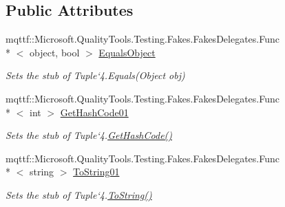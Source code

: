 \subsection*{Public Attributes}
\begin{DoxyCompactItemize}
\item 
mqttf\-::\-Microsoft.\-Quality\-Tools.\-Testing.\-Fakes.\-Fakes\-Delegates.\-Func\\*
$<$ object, bool $>$ \hyperlink{class_system_1_1_fakes_1_1_stub_tuple_3_01_t1_00_01_t2_00_01_t3_00_01_t4_01_4_ab607235e86fc97cb666af54eafa5be89}{Equals\-Object}
\begin{DoxyCompactList}\small\item\em Sets the stub of Tuple`4.Equals(\-Object obj)\end{DoxyCompactList}\item 
mqttf\-::\-Microsoft.\-Quality\-Tools.\-Testing.\-Fakes.\-Fakes\-Delegates.\-Func\\*
$<$ int $>$ \hyperlink{class_system_1_1_fakes_1_1_stub_tuple_3_01_t1_00_01_t2_00_01_t3_00_01_t4_01_4_a571aba542f69ae42dd1889a08bde7edd}{Get\-Hash\-Code01}
\begin{DoxyCompactList}\small\item\em Sets the stub of Tuple`4.\hyperlink{class_system_1_1_fakes_1_1_stub_tuple_3_01_t1_00_01_t2_00_01_t3_00_01_t4_01_4_ad744f3a9a2103626bc7c4d22136655a4}{Get\-Hash\-Code()}\end{DoxyCompactList}\item 
mqttf\-::\-Microsoft.\-Quality\-Tools.\-Testing.\-Fakes.\-Fakes\-Delegates.\-Func\\*
$<$ string $>$ \hyperlink{class_system_1_1_fakes_1_1_stub_tuple_3_01_t1_00_01_t2_00_01_t3_00_01_t4_01_4_a34dbd34860fe0d6373c9cb476f6f4d4e}{To\-String01}
\begin{DoxyCompactList}\small\item\em Sets the stub of Tuple`4.\hyperlink{class_system_1_1_fakes_1_1_stub_tuple_3_01_t1_00_01_t2_00_01_t3_00_01_t4_01_4_af47bd19056b77b15be4aef2156d44868}{To\-String()}\end{DoxyCompactList}\end{DoxyCompactItemize}
